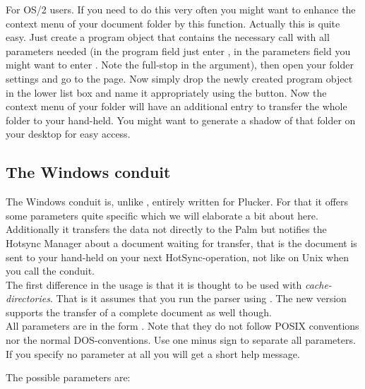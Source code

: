 \hint{} For OS/2 users. If you need to do this very often you might 
want to enhance the context menu of your document folder by this function.
Actually this is quite easy. Just create a program object that
contains the necessary call with all parameters needed (in the program
field just enter , in the parameters field you
might want to enter . Note the full-stop in the argument),
then open your folder settings and go to the  page. Now
simply drop the newly created program object in the lower list box and
name it appropriately using the  button. Now the
context menu of your folder will have an additional entry to transfer
the whole folder to your hand-held. You might want to generate a shadow
of that folder on your desktop for easy access.

\subsection{The Windows conduit}

The Windows conduit is, unlike , entirely written for
Plucker. For that it offers some parameters quite specific which we
will elaborate a bit about here. Additionally it transfers the data
not directly to the Palm but notifies the Hotsync Manager about a
document waiting for transfer, that is the document is sent to
your hand-held on your next HotSync-operation, not like on Unix when
you call the conduit.\\

The first difference in the usage is that it is thought to be used with
\textit{cache-directories}. That is it assumes that you run the parser
using . The new version supports the transfer of a complete
document as well though. \\

All parameters are in the form . Note that 
they do not follow POSIX conventions nor the normal DOS-conventions. 
Use one minus sign to separate all parameters. If you specify no 
parameter at all you will get a short help message.

The possible parameters are:

